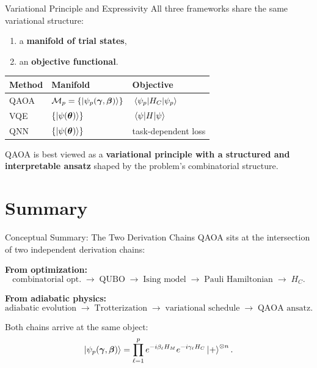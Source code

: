 \documentclass[aspectratio=169]{beamer}
\begin{document}
\begin{frame}{Variational Principle and Expressivity}
All three frameworks share the same variational structure:
\begin{enumerate}
    \item a \textbf{manifold of trial states},
    \item an \textbf{objective functional}.
\end{enumerate}

\medskip
\begin{center}
\begin{tabular}{lll}
\toprule
Method & Manifold & Objective \\
\midrule
QAOA & \(\mathcal{M}_p = \{\ket{\psi_p(\bm{\gamma},\bm{\beta})}\}\) & \(\ev{H_C}{\psi_p}\) \\[4pt]
VQE  & \(\{\ket{\psi(\bm{\theta})}\}\) & \(\ev{H}{\psi}\) \\[4pt]
QNN  & \(\{\ket{\psi(\bm{\theta})}\}\) & task-dependent loss \\
\bottomrule
\end{tabular}
\end{center}

\medskip
QAOA is best viewed as a \textbf{variational principle with a structured and
interpretable ansatz} shaped by the problem's combinatorial structure.
\end{frame}

\section{Summary}

\begin{frame}{Conceptual Summary: The Two Derivation Chains}
QAOA sits at the intersection of two independent derivation chains:

\medskip
\textbf{From optimization:}
\[
\text{combinatorial opt.}
\;\to\;
\text{QUBO}
\;\to\;
\text{Ising model}
\;\to\;
\text{Pauli Hamiltonian}
\;\to\;
H_C.
\]

\textbf{From adiabatic physics:}
\[
\text{adiabatic evolution}
\;\to\;
\text{Trotterization}
\;\to\;
\text{variational schedule}
\;\to\;
\text{QAOA ansatz}.
\]

\medskip
Both chains arrive at the same object:
\[
\ket{\psi_p(\bm{\gamma},\bm{\beta})}
=
\prod_{\ell=1}^p e^{-i\beta_\ell H_M}e^{-i\gamma_\ell H_C}\ket{+}^{\otimes n}.
\]
\end{frame}
\end{document}
